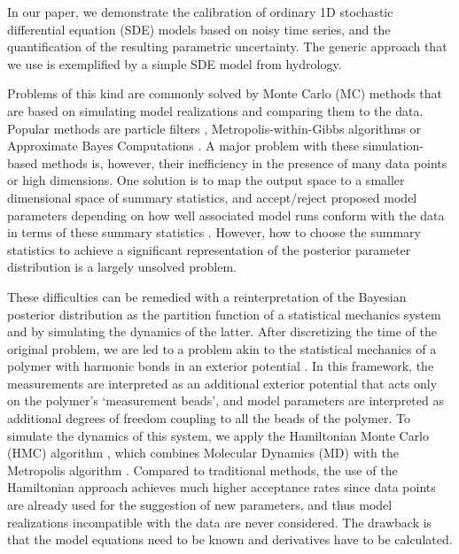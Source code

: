 \documentclass[11pt]{article}
\theoremstyle{definition}
\begin{document}
In our paper, we demonstrate the calibration of ordinary 1D stochastic differential equation (SDE) models based on noisy time series, and the quantification of the resulting parametric uncertainty. The generic approach that we use is exemplified by a simple SDE model from hydrology.

Problems of this kind are commonly solved by Monte Carlo (MC) methods that are based on simulating model realizations and comparing them to the data. Popular methods are particle filters \cite{chopin_2013_SMC2}, Metropolis-within-Gibbs algorithms \cite{tomassini_2009_smoothing, reichert_2009_timedepParameters} or Approximate Bayes Computations \cite{marin_2012_ABC, Albert_2014_ABC}.
A major problem with these simulation-based methods is, however, their inefficiency in the presence of many data points or high dimensions. One solution is to map the output space to a smaller dimensional space of summary statistics, and accept/reject proposed model parameters depending on how well associated model runs conform with the data in terms of these summary statistics \cite{Fearnhead_2012_ABC}. However, how to choose the summary statistics to achieve a significant representation of the posterior parameter distribution is a largely unsolved problem.

These difficulties can be remedied with a reinterpretation of the Bayesian posterior distribution as the partition function of a statistical mechanics system and by simulating the dynamics of the latter.
After discretizing the time of the original problem, we are led to a problem akin to the statistical mechanics of a polymer %
with harmonic bonds in an exterior potential \cite{chandler_1981_polymer}. In this framework, the measurements are interpreted as an additional exterior potential that acts only on the polymer's `measurement beads', and model parameters are interpreted as additional degrees of freedom coupling to all the beads of the polymer.
To simulate the dynamics of this system, we apply the Hamiltonian Monte Carlo (HMC) algorithm \cite{duane_1987}, which combines Molecular Dynamics (MD) \cite{alder_1959_MD, rahman_1964_MD} with the Metropolis algorithm  \cite{metropolis_1953}.
Compared to traditional methods, the use of the Hamiltonian approach achieves much higher acceptance rates since data points are already used for the suggestion of new parameters, and thus model realizations incompatible with the data are never considered. The drawback is that the model equations need to be known and derivatives have to be calculated.
\end{document}
